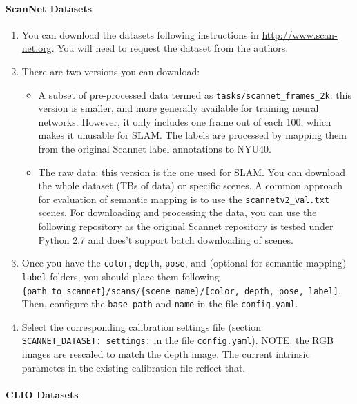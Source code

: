 \documentclass{article}
\providecommand{\tightlist}{%
  \setlength{\itemsep}{0pt}\setlength{\parskip}{0pt}}
\let\oldparagraph\paragraph
\renewcommand{\paragraph}[1]{\oldparagraph{#1}\mbox{}}
\begin{document}
\hypertarget{scannet-datasets}{%
\paragraph{ScanNet Datasets}\label{scannet-datasets}}

\begin{enumerate}
\def\labelenumi{\arabic{enumi}.}
\tightlist
\item
  You can download the datasets following instructions in
  \href{http://www.scan-net.org}{http://www.scan-net.org}. You will need to request the dataset from
  the authors.
\item
  There are two versions you can download:
\begin{itemize}
\tightlist
\item
  A subset of pre-processed data termed as
  \texttt{tasks/scannet\_frames\_2k}: this version is smaller, and more
  generally available for training neural networks. However, it only
  includes one frame out of each 100, which makes it unusable for SLAM.
  The labels are processed by mapping them from the original Scannet
  label annotations to NYU40.
\item
  The raw data: this version is the one used for SLAM. You can download
  the whole dataset (TBs of data) or specific scenes. A common approach
  for evaluation of semantic mapping is to use the
  \texttt{scannetv2\_val.txt} scenes. For downloading and processing the
  data, you can use the following
  \href{https://github.com/dvdmc/scannet-processing}{repository} as the
  original Scannet repository is tested under Python 2.7 and does't
  support batch downloading of scenes.
\end{itemize}
\item
  Once you have the \texttt{color}, \texttt{depth}, \texttt{pose}, and
  (optional for semantic mapping) \texttt{label} folders, you should
  place them following
  \texttt{\{path\_to\_scannet\}/scans/\{scene\_name\}/{[}color,\ depth,\ pose,\ label{]}}.
  Then, configure the \texttt{base\_path} and \texttt{name} in the file
  \texttt{config.yaml}.
\item
  Select the corresponding calibration settings file (section
  \texttt{SCANNET\_DATASET:\ settings:} in the file
  \texttt{config.yaml}). NOTE: the RGB images are rescaled to match the
  depth image. The current intrinsic parametes in the existing
  calibration file reflect that.
\end{enumerate}

\hypertarget{clio-datasets}{%
\paragraph{CLIO Datasets}\label{clio-datasets}}
\end{document}

